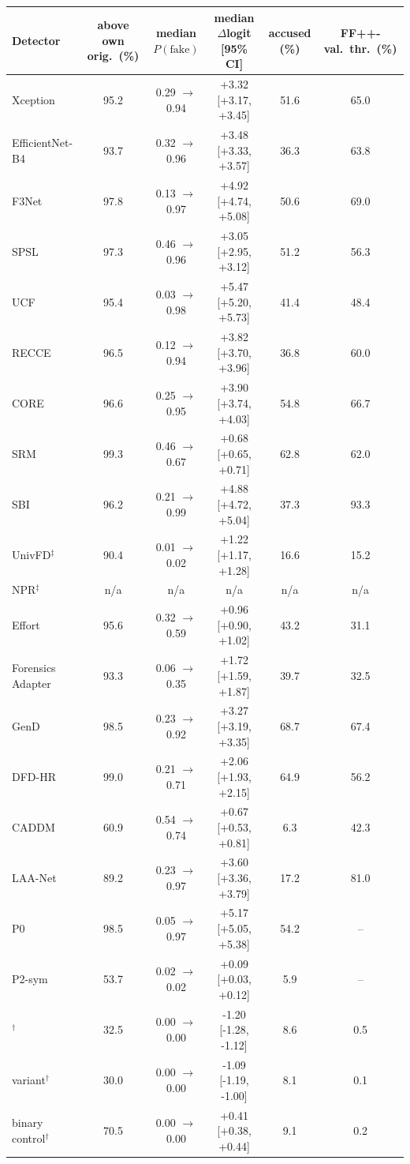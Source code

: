 \begin{tabular}{@{}l ccccc@{}}
\toprule
Detector & above own orig.\ (\%) & median $P(\text{fake})$ & median $\Delta$logit [95\% CI] & accused (\%) & FF++-val.\ thr.\ (\%) \\
\midrule
Xception~\cite{xception} & 95.2 & 0.29 $\rightarrow$ 0.94 & +3.32 [+3.17, +3.45] & 51.6 & 65.0 \\
EfficientNet-B4~\cite{efficientnet} & 93.7 & 0.32 $\rightarrow$ 0.96 & +3.48 [+3.33, +3.57] & 36.3 & 63.8 \\
F3Net~\cite{f3net} & 97.8 & 0.13 $\rightarrow$ 0.97 & +4.92 [+4.74, +5.08] & 50.6 & 69.0 \\
SPSL~\cite{spsl} & 97.3 & 0.46 $\rightarrow$ 0.96 & +3.05 [+2.95, +3.12] & 51.2 & 56.3 \\
UCF~\cite{ucf} & 95.4 & 0.03 $\rightarrow$ 0.98 & +5.47 [+5.20, +5.73] & 41.4 & 48.4 \\
RECCE~\cite{recce} & 96.5 & 0.12 $\rightarrow$ 0.94 & +3.82 [+3.70, +3.96] & 36.8 & 60.0 \\
CORE~\cite{core} & 96.6 & 0.25 $\rightarrow$ 0.95 & +3.90 [+3.74, +4.03] & 54.8 & 66.7 \\
SRM~\cite{srm} & 99.3 & 0.46 $\rightarrow$ 0.67 & +0.68 [+0.65, +0.71] & 62.8 & 62.0 \\
SBI~\cite{sbi} & 96.2 & 0.21 $\rightarrow$ 0.99 & +4.88 [+4.72, +5.04] & 37.3 & 93.3 \\
UnivFD$^\ddagger$~\cite{univfd} & 90.4 & 0.01 $\rightarrow$ 0.02 & +1.22 [+1.17, +1.28] & 16.6 & 15.2 \\
NPR$^\ddagger$~\cite{npr} & n/a & n/a & n/a & n/a & n/a \\
Effort~\cite{effort} & 95.6 & 0.32 $\rightarrow$ 0.59 & +0.96 [+0.90, +1.02] & 43.2 & 31.1 \\
Forensics Adapter~\cite{forensicsadapter} & 93.3 & 0.06 $\rightarrow$ 0.35 & +1.72 [+1.59, +1.87] & 39.7 & 32.5 \\
GenD~\cite{gend2026} & 98.5 & 0.23 $\rightarrow$ 0.92 & +3.27 [+3.19, +3.35] & 68.7 & 67.4 \\
DFD-HR~\cite{dfdhr2026} & 99.0 & 0.21 $\rightarrow$ 0.71 & +2.06 [+1.93, +2.15] & 64.9 & 56.2 \\
CADDM~\cite{caddm} & 60.9 & 0.54 $\rightarrow$ 0.74 & +0.67 [+0.53, +0.81] & 6.3 & 42.3 \\
LAA-Net~\cite{laanet} & 89.2 & 0.23 $\rightarrow$ 0.97 & +3.60 [+3.36, +3.79] & 17.2 & 81.0 \\
\midrule
P0 & 98.5 & 0.05 $\rightarrow$ 0.97 & +5.17 [+5.05, +5.38] & 54.2 & -- \\
P2-sym & 53.7 & 0.02 $\rightarrow$ 0.02 & +0.09 [+0.03, +0.12] & 5.9 & -- \\
\ours{}$^\dagger$ & 32.5 & 0.00 $\rightarrow$ 0.00 & -1.20 [-1.28, -1.12] & 8.6 & 0.5 \\
\quad \ours{} variant$^\dagger$ & 30.0 & 0.00 $\rightarrow$ 0.00 & -1.09 [-1.19, -1.00] & 8.1 & 0.1 \\
binary control$^\dagger$ & 70.5 & 0.00 $\rightarrow$ 0.00 & +0.41 [+0.38, +0.44] & 9.1 & 0.2 \\
\bottomrule
\end{tabular}
